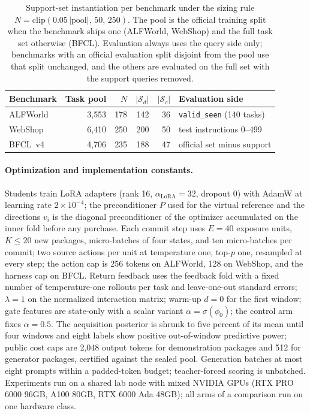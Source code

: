 \begin{table}[h]
\centering
\caption{Support-set instantiation per benchmark under the sizing
rule $N=\mathrm{clip}(0.05\,|\text{pool}|,\,50,\,250)$. The pool is
the official training split when the benchmark ships one (ALFWorld,
WebShop) and the full task set otherwise (BFCL).
Evaluation always uses the query side only; benchmarks with an
official evaluation split disjoint from the pool use that split
unchanged, and the others are evaluated on the full set with the
support queries removed.}
\label{tab:support-sizes}
\small
\begin{tabular}{lrrrrl}
\toprule
Benchmark & Task pool & $N$ & $|\mathcal{S}_d|$ & $|\mathcal{S}_c|$
& Evaluation side\\
\midrule
ALFWorld & 3{,}553 & 178 & 142 & 36 & \texttt{valid\_seen} (140 tasks)\\
WebShop & 6{,}410 & 250 & 200 & 50 & test instructions 0--499\\
BFCL~v4 & 4{,}706 & 235 & 188 & 47 & official set minus support\\
\bottomrule
\end{tabular}
\end{table}
\paragraph{Optimization and implementation constants.}
Students train LoRA adapters (rank 16, $\alpha_{\mathrm{LoRA}}=32$,
dropout 0) with AdamW at learning rate $2\times10^{-4}$; the
preconditioner $P$ used for the virtual reference and the directions
$v_i$ is the diagonal preconditioner of the optimizer accumulated on
the inner fold before any purchase. Each commit step uses $E=40$
exposure units, $K\le 20$ new packages, micro-batches of four states,
and ten micro-batches per commit; two source actions per unit at
temperature one, top-$p$ one, resampled at every step; the action cap
is 256 tokens on ALFWorld, 128 on WebShop, and the harness cap on
BFCL. Return
feedback uses the feedback fold with a fixed number of temperature-one
rollouts per task and leave-one-out standard errors; $\lambda=1$ on
the normalized interaction matrix; warm-up $d=0$ for the first window;
gate features are state-only with a scalar variant
$\alpha=\sigma(\phi_0)$; the control arm fixes $\alpha=0.5$. The
acquisition posterior is shrunk to five percent of its mean until four
windows and eight labels show positive out-of-window predictive power;
public cost caps are 2{,}048 output tokens for demonstration packages
and 512 for generator packages, certified against the sealed pool.
Generation batches at most eight prompts within a padded-token budget;
teacher-forced scoring is unbatched. Experiments run on a shared lab node with mixed NVIDIA GPUs (RTX PRO
6000 96GB, A100 80GB, RTX 6000 Ada 48GB); all arms of a comparison run
on one hardware class.

